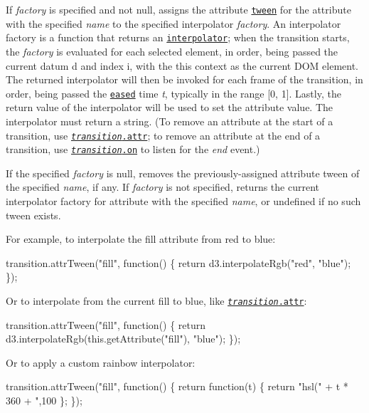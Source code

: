 If {\itshape factory} is specified and not null, assigns the attribute \href{#transition_tween}{\tt tween} for the attribute with the specified {\itshape name} to the specified interpolator {\itshape factory}. An interpolator factory is a function that returns an \href{https://github.com/d3/d3-interpolate}{\tt interpolator}; when the transition starts, the {\itshape factory} is evaluated for each selected element, in order, being passed the current datum {\ttfamily d} and index {\ttfamily i}, with the {\ttfamily this} context as the current D\+OM element. The returned interpolator will then be invoked for each frame of the transition, in order, being passed the \href{#transition_ease}{\tt eased} time {\itshape t}, typically in the range \mbox{[}0, 1\mbox{]}. Lastly, the return value of the interpolator will be used to set the attribute value. The interpolator must return a string. (To remove an attribute at the start of a transition, use \href{#transition_attr}{\tt {\itshape transition}.attr}; to remove an attribute at the end of a transition, use \href{#transition_on}{\tt {\itshape transition}.on} to listen for the {\itshape end} event.)

If the specified {\itshape factory} is null, removes the previously-\/assigned attribute tween of the specified {\itshape name}, if any. If {\itshape factory} is not specified, returns the current interpolator factory for attribute with the specified {\itshape name}, or undefined if no such tween exists.

For example, to interpolate the fill attribute from red to blue\+:


\begin{DoxyCode}
transition.attrTween("fill", function() \{
  return d3.interpolateRgb("red", "blue");
\});
\end{DoxyCode}


Or to interpolate from the current fill to blue, like \href{#transition_attr}{\tt {\itshape transition}.attr}\+:


\begin{DoxyCode}
transition.attrTween("fill", function() \{
  return d3.interpolateRgb(this.getAttribute("fill"), "blue");
\});
\end{DoxyCode}


Or to apply a custom rainbow interpolator\+:


\begin{DoxyCode}
transition.attrTween("fill", function() \{
  return function(t) \{
    return "hsl(" + t * 360 + ",100%
  \};
\});
\end{DoxyCode}


